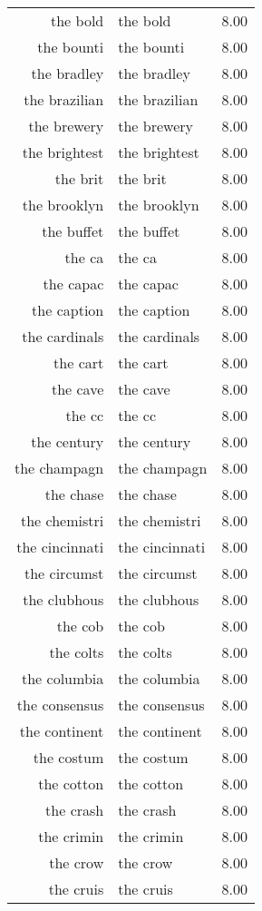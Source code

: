 \begin{table}[ht]
\begin{tabular}{rlr}
  the bold & the bold & 8.00 \\ 
  the bounti & the bounti & 8.00 \\ 
  the bradley & the bradley & 8.00 \\ 
  the brazilian & the brazilian & 8.00 \\ 
  the brewery & the brewery & 8.00 \\ 
  the brightest & the brightest & 8.00 \\ 
  the brit & the brit & 8.00 \\ 
  the brooklyn & the brooklyn & 8.00 \\ 
  the buffet & the buffet & 8.00 \\ 
  the ca & the ca & 8.00 \\ 
  the capac & the capac & 8.00 \\ 
  the caption & the caption & 8.00 \\ 
  the cardinals & the cardinals & 8.00 \\ 
  the cart & the cart & 8.00 \\ 
  the cave & the cave & 8.00 \\ 
  the cc & the cc & 8.00 \\ 
  the century & the century & 8.00 \\ 
  the champagn & the champagn & 8.00 \\ 
  the chase & the chase & 8.00 \\ 
  the chemistri & the chemistri & 8.00 \\ 
  the cincinnati & the cincinnati & 8.00 \\ 
  the circumst & the circumst & 8.00 \\ 
  the clubhous & the clubhous & 8.00 \\ 
  the cob & the cob & 8.00 \\ 
  the colts & the colts & 8.00 \\ 
  the columbia & the columbia & 8.00 \\ 
  the consensus & the consensus & 8.00 \\ 
  the continent & the continent & 8.00 \\ 
  the costum & the costum & 8.00 \\ 
  the cotton & the cotton & 8.00 \\ 
  the crash & the crash & 8.00 \\ 
  the crimin & the crimin & 8.00 \\ 
  the crow & the crow & 8.00 \\ 
  the cruis & the cruis & 8.00 \\ 

\end{tabular}
\end{table}
